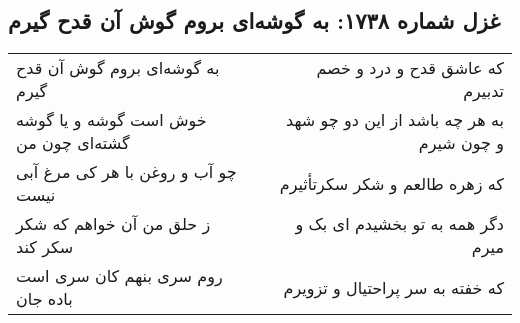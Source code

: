\begin{center}
\section*{غزل شماره ۱۷۳۸: به گوشه‌ای بروم گوش آن قدح گیرم}
\label{sec:1738}
\begin{longtable}{l p{0.5cm} r}
به گوشه‌ای بروم گوش آن قدح گیرم
&&
که عاشق قدح و درد و خصم تدبیرم
\\
خوش است گوشه و یا گوشه گشته‌ای چون من
&&
به هر چه باشد از این دو چو شهد و چون شیرم
\\
چو آب و روغن با هر کی مرغ آبی نیست
&&
که زهره طالعم و شکر سکرتأثیرم
\\
ز حلق من آن خواهم که شکر سکر کند
&&
دگر همه به تو بخشیدم ای بک و میرم
\\
روم سری بنهم کان سری است باده جان
&&
که خفته به سر پراحتیال و تزویرم
\\
\end{longtable}
\end{center}
